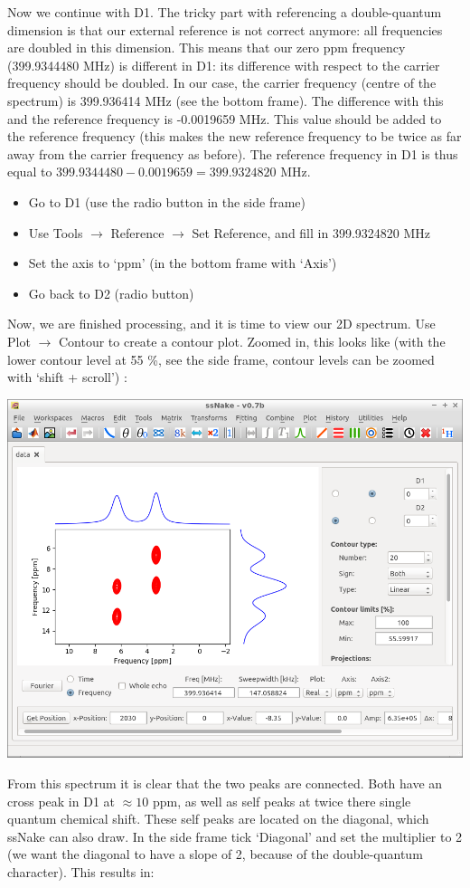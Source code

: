 \documentclass[11pt,a4paper]{article}
\begin{document}
Now we continue with D1.
The tricky part with referencing a double-quantum dimension is that our external reference is not correct anymore: all frequencies are doubled in this dimension.
This means that our zero ppm frequency (399.9344480 MHz) is different in D1: its difference with
respect to the carrier frequency should be doubled.
In our case, the carrier frequency (centre of the spectrum) is 399.936414 MHz (see the bottom frame).
The difference with this and the reference frequency is -0.0019659 MHz. This value should be added to the reference frequency (this makes the new reference frequency to be twice as far away from the carrier frequency as before).
The reference frequency in D1 is thus equal to  $399.9344480 -0.0019659 = 399.9324820$ MHz.

\begin{itemize}
  \item Go to D1 (use the radio button in the side frame)
  \item Use Tools $\longrightarrow$ Reference $\longrightarrow$ Set Reference, and fill in
399.9324820 MHz
  \item Set the axis to `ppm' (in the bottom frame with `Axis')
  \item Go back to D2 (radio button)
\end{itemize}
Now, we are finished processing, and it is time to view our 2D spectrum.
Use Plot $\longrightarrow$ Contour to create a contour plot.
Zoomed in, this looks like (with the lower contour level at 55 \%, see the side frame, contour levels can be zoomed with `shift + scroll') :

\begin{center}
\includegraphics[width=0.7\linewidth]{Figs/Fig7.png}
\end{center}
From this spectrum it is clear that the two peaks are connected.
Both have an cross peak in D1 at $\approx 10$ ppm, as well as self peaks at twice there single quantum chemical shift.
These self peaks are located on the diagonal, which ssNake can also draw.
In the side frame tick `Diagonal' and set the multiplier to 2 (we want the diagonal to have a slope of 2, because of the double-quantum character).
This results in:
\end{document}
